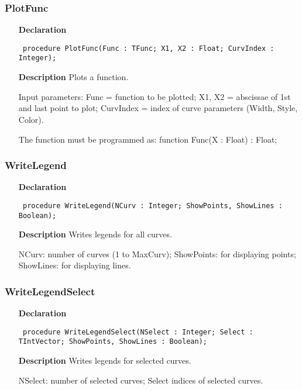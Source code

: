 \documentclass[12pt,a4paper,oneside]{report}
\newcommand{\declarationitem}[1]{\textbf{#1}}
\newcommand{\descriptiontitle}[1]{\textbf{#1}}
\newcommand{\code}[1]{\texttt{#1}}
\begin{document}
\subsubsection{PlotFunc}
\label{uplot-PlotFunc}
\begin{itemize}\item[\declarationitem{Declaration}\hfill]
	\begin{flushleft}
		\code{
			procedure PlotFunc(Func : TFunc; X1, X2 : Float; CurvIndex : Integer);}
		
	\end{flushleft}
	
	\par
	\item[\descriptiontitle{Description}]
	Plots a function.
	
	Input parameters: Func = function to be plotted; X1, X2 = abscissae of 1st and last point to plot; CurvIndex = index of curve parameters (Width, Style, Color).
	
	The function must be programmed as: function Func(X : Float) : Float;
	
\end{itemize}
\subsubsection{WriteLegend}
\label{uplot-WriteLegend}
\begin{itemize}\item[\declarationitem{Declaration}\hfill]
	\begin{flushleft}
		\code{
			procedure WriteLegend(NCurv : Integer; ShowPoints, ShowLines : Boolean);}
		
	\end{flushleft}
	
	\par
	\item[\descriptiontitle{Description}]
	Writes legends for all curves.
	
	NCurv: number of curves (1 to MaxCurv); ShowPoints: for displaying points; ShowLines: for displaying lines.
	
\end{itemize}
\subsubsection{WriteLegendSelect}
\label{uplot-WriteLegendSelect}
\begin{itemize}\item[\declarationitem{Declaration}\hfill]
	\begin{flushleft}
		\code{
			procedure WriteLegendSelect(NSelect : Integer; Select : TIntVector; ShowPoints, ShowLines : Boolean);}
		
	\end{flushleft}
	
	\par
	\item[\descriptiontitle{Description}]
	Writes legends for selected curves.
	
	NSelect: number of selected curves; Select  indices of selected curves.
	
\end{itemize}
\end{document}
